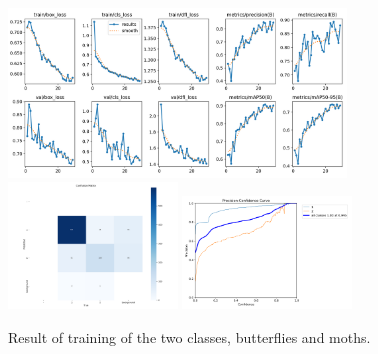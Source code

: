 \documentclass{cpsc202}
\begin{document}
    \begin{figure}
        \begin{center}
            \includegraphics[width=0.8\textwidth]{trained_two_classes/results}
            \includegraphics[width=0.4\textwidth]{trained_two_classes/confusion_matrix}
            \includegraphics[width=0.4\textwidth]{trained_two_classes/P_curve}
        \end{center}
        \caption{Result of training of the two classes, butterflies and moths.}
        \label{fig:results-two-classes}
    \end{figure}
\end{document}
